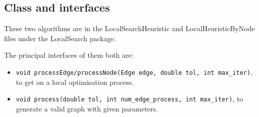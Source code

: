 \subsection{Class and interfaces}
These two algorithms are in the LocalSearchHeuristic and LocalHeuristicByNode files under the LocalSearch package.

The principal interfaces of them both are:
\begin{itemize}
    \item \lstinline{void processEdge/processNode(Edge edge, double tol, int max_iter)}, to get on a local optimisation process.
    \item \lstinline{void process(double tol, int num_edge_process, int max_iter)}, to generate a valid graph with given parameters.
\end{itemize}
\quad